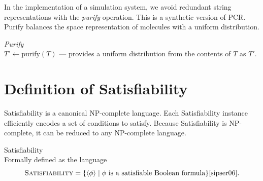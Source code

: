 In the implementation of a simulation system, we avoid redundant string representations with the \textit{purify} operation.  This is a synthetic version of PCR.  Purify balances the space representation of molecules with a uniform distribution.
\begin{definition}
\textit{Purify}\\
$T' \leftarrow \text{purify}(T)$ --- provides a uniform distribution from the contents of $T$ as $T'$.
\end{definition}


	
\section{Definition of {\sc Satisfiability}}

	
{\sc Satisfiability} is a canonical \textsf{NP-complete} language.  Each {\sc Satisfiability} instance efficiently encodes a set of conditions to satisfy.  Because {\sc Satisfiability} is \textsf{NP-complete}, it can be reduced to any \textsf{NP-complete} language.

\begin{definition}
{\sc Satisfiability}\\
Formally defined as the language
\[
\text{\sc Satisfiability} = \{ \langle \phi \rangle \mid \phi \text{ is a satisfiable Boolean formula}\} \cite{sipser06}.
\]	
\end{definition}


